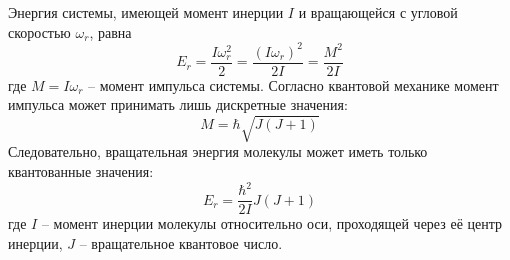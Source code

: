 Энергия системы, имеющей момент инерции \( I \) и вращающейся с 
угловой скоростью \( \omega_r \), равна 
\[ 
	E_r = \frac{I\omega^2_r}{2} = \frac{(I\omega_r)^2}{2I} = 
	\frac{M^2}{2I}
\]
где \( M = I\omega_r \) -- момент импульса системы. Согласно 
квантовой механике момент импульса может принимать лишь 
дискретные значения:
\[ M = \hbar\sqrt{J(J+1)} \]
Следовательно, вращательная энергия молекулы может иметь только 
квантованные значения:
\[ E_r = \frac{\hbar^2}{2I}J(J+1) \]
где \( I \) -- момент инерции молекулы относительно оси, проходящей 
через её центр инерции, \( J \) -- вращательное квантовое число.

\newpage
